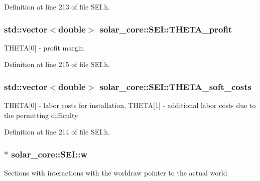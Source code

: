 Definition at line 213 of file S\+E\+I.\+h.

\hypertarget{classsolar__core_1_1_s_e_i_a9137f81a58ab1325d8b37590afe267aa}{}
\subsubsection[{T\+H\+E\+T\+A\+\_\+profit}]{\setlength{\rightskip}{0pt plus 5cm}std\+::vector$<$double$>$ solar\+\_\+core\+::\+S\+E\+I\+::\+T\+H\+E\+T\+A\+\_\+profit\hspace{0.3cm}{\ttfamily [protected]}}\label{classsolar__core_1_1_s_e_i_a9137f81a58ab1325d8b37590afe267aa}
T\+H\+E\+T\+A\mbox{[}0\mbox{]} -\/ profit margin 

Definition at line 215 of file S\+E\+I.\+h.

\hypertarget{classsolar__core_1_1_s_e_i_a1be690a943dc872af0ed3540c81f1d6b}{}
\subsubsection[{T\+H\+E\+T\+A\+\_\+soft\+\_\+costs}]{\setlength{\rightskip}{0pt plus 5cm}std\+::vector$<$double$>$ solar\+\_\+core\+::\+S\+E\+I\+::\+T\+H\+E\+T\+A\+\_\+soft\+\_\+costs\hspace{0.3cm}{\ttfamily [protected]}}\label{classsolar__core_1_1_s_e_i_a1be690a943dc872af0ed3540c81f1d6b}
T\+H\+E\+T\+A\mbox{[}0\mbox{]} -\/ labor costs for installation, T\+H\+E\+T\+A\mbox{[}1\mbox{]} -\/ additional labor costs due to the permitting difficulty 

Definition at line 214 of file S\+E\+I.\+h.

\hypertarget{classsolar__core_1_1_s_e_i_a82e0c6b5f6d83639a08c1bc357fd3466}{}
\subsubsection[{w}]{$\ast$ solar\+\_\+core\+::\+S\+E\+I\+::w\hspace{0.3cm}{\ttfamily [protected]}}\label{classsolar__core_1_1_s_e_i_a82e0c6b5f6d83639a08c1bc357fd3466}
Sections with interactions with the worldraw pointer to the actual world 

